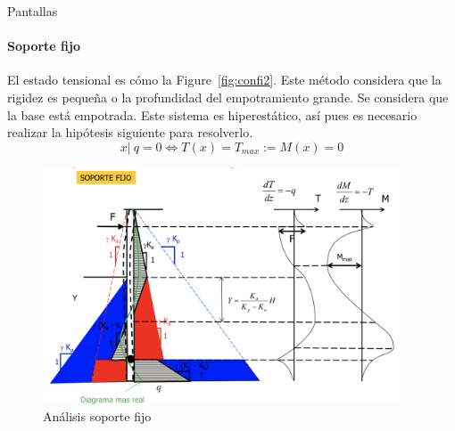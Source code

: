 \begin{mybox}{Pantallas}
	\paragraph{Soporte fijo} %
	\label{par:soporte_fijo}
	El estado tensional es cómo la Figure~\ref{fig:confi2}. Este método considera que la rigidez es pequeña o la profundidad del empotramiento grande. Se considera que la base está empotrada. Este sistema es hiperestático, así pues es necesario realizar la hipótesis siguiente para resolverlo.
	\[
		x | \ q=0 \Leftrightarrow T(x) = T_{max} := M(x)=0
	\]
	\begin{figure}[H]
		\centering
		\includegraphics[width=0.95\textwidth]{img/soporte_fijo}
		\caption{Análisis soporte fijo}
		\label{fig:soporte_fijo}
	\end{figure}
\end{mybox}

